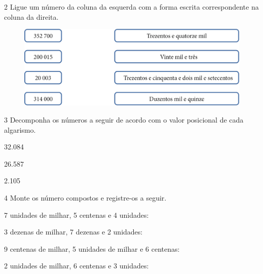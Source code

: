 \num{2} Ligue um número da coluna da esquerda com a forma escrita correspondente na coluna da direita.

\begin{figure}[htpb!]
\centering
\includegraphics[width=\textwidth]{media/image6.png}
\end{figure}



\num{3} Decomponha os números a seguir de acordo com o valor posicional de cada
algarismo.

\begin{escolha}
\item 32.084

\item
  26.587
  
\item
  2.105
\end{escolha}


\num{4} Monte os número compostos e registre-os a seguir.

\begin{escolha}
\item
  7 unidades de milhar, 5 centenas e 4 unidades: 

\item
  3 dezenas de milhar, 7 dezenas e 2 unidades: 

\item
  9 centenas de milhar, 5 unidades de milhar e 6 centenas: 

\item
  2 unidades de milhar, 6 centenas e 3 unidades: \reduline{2.603\hfill}
\end{escolha}

